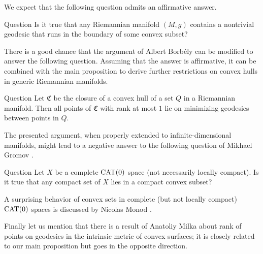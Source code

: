 \documentclass[a4paper,10pt]{article}
\begin{document}
We expect that the following question admits an affirmative answer.

\begin{thm}{Question}
Is it true that any Riemannian manifold $(M,g)$ contains a nontrivial geodesic  that runs in the boundary of some convex 
subset?
\end{thm}

There is a good chance that the argument of Albert Borb\'{e}ly  \cite[Lemma 2.1]{borbely} can be modified to answer the following question. 
Assuming that the answer is affirmative, it can be combined with the main proposition to derive further restrictions on convex hulls in generic Riemannian manifolds.

\begin{thm}{Question}
Let $\mathfrak{C}$ be the closure of a convex hull of a set $Q$ in a Riemannian manifold.
Then all points of $\mathfrak {C}$ with rank at most $1$ lie on minimizing geodesics between points in $Q$.
\end{thm}

The presented argument, when properly extended to infinite-dimensional manifolds, might lead to a negative answer to the following question of Mikhael Gromov \cite[6.B$_1\text{(f)}$]{gromov-1993}.

\begin{thm}{Question}
Let $X$ be a complete  $\operatorname{\rm CAT}(0)$ space (not necessarily locally compact).
Is it true that any compact set of $X$ lies in a compact convex subset?
\end{thm}

A surprising behavior of convex sets in complete (but not locally compact) $\operatorname{\rm CAT}(0)$ spaces is discussed by Nicolas Monod \cite{monod}.

Finally let us mention that there is a result of Anatoliy Milka \cite[§~4]{milka} about rank of points on geodesics in the intrinsic metric of convex surfaces; it is closely related to our main proposition but goes in the opposite direction.

{\sloppy
\printbibliography[heading=bibintoc]
\fussy
}
\end{document}
